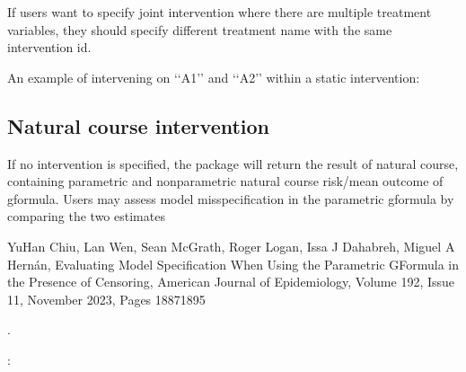 \documentclass[letterpaper,10pt,english]{sphinxmanual}
\begin{document}
\sphinxAtStartPar
If users want to specify joint intervention where there are multiple treatment variables,
they should specify different treatment name with the same intervention id.

\sphinxAtStartPar
An example of intervening on ‘‘A1’’ and ‘‘A2’’ within a static intervention:

\begin{sphinxVerbatim}[commandchars=\\\{\}]
  \PYG{p}{[} \PYG{p}{]}
  \PYG{p}{[} \PYG{p}{]}
\end{sphinxVerbatim}


\subsection{Natural course intervention}
\label{\detokenize{Specifications/Interventions:natural-course-intervention}}
\sphinxAtStartPar
If no intervention is specified, the package will return the result of natural course, containing
parametric and nonparametric natural course risk/mean outcome of g\sphinxhyphen{}formula. Users may assess model misspecification in
the parametric g\sphinxhyphen{}formula by comparing the two estimates \sphinxstepexplicit %
\begin{footnote}[3]\label{\thesphinxscope.3}%
\sphinxAtStartFootnote
Yu\sphinxhyphen{}Han Chiu, Lan Wen, Sean McGrath, Roger Logan, Issa J Dahabreh, Miguel A Hernán, Evaluating Model Specification
When Using the Parametric G\sphinxhyphen{}Formula in the Presence of Censoring, American Journal of Epidemiology, Volume 192, Issue 11, November 2023, Pages 1887\textendash{}1895
%
\end{footnote}.

\sphinxAtStartPar
{} :
\end{document}
